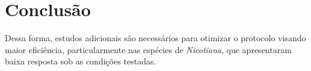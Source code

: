 \section{Conclusão}
Dessa forma, estudos adicionais são necessários para otimizar o protocolo visando
maior eficiência, particularmente nas espécies de \textit{Nicotiana}, que
apresentaram baixa resposta sob as condições testadas. 
